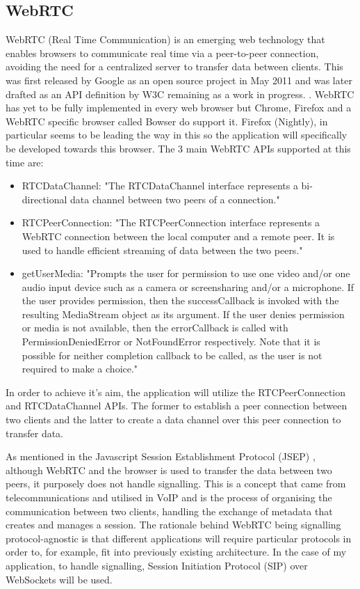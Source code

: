\documentclass[]{report}
\begin{document}
			\subsection*{WebRTC}			
			WebRTC (Real Time Communication) is an emerging web technology that enables browsers to communicate real time via a peer-to-peer connection, avoiding the need for a centralized server to transfer data between clients. This was first released by Google as an open source project in May 2011 \cite{Google WebRTC Release} and was later drafted as an API definition by W3C remaining as a work in progress. \cite{W3C WebRTC Definition}. WebRTC has yet to be fully implemented in every web browser but Chrome, Firefox and a WebRTC specific browser called Bowser do support it. Firefox (Nightly), in particular seems to be leading the way in this so the application will specifically be developed towards this browser\cite{WebRTC browser support}.
			The 3 main WebRTC APIs supported at this time are:
				\begin{itemize}
					\item RTCDataChannel:
					"The RTCDataChannel interface represents a bi-directional data channel between two peers of a connection." \cite{Mozilla Web API}
					\item RTCPeerConnection:
					"The RTCPeerConnection interface represents a WebRTC connection between the local computer and a remote peer. It is used to handle efficient streaming of data between the two peers." 
					\cite{Mozilla Web API}
					\item getUserMedia:
					"Prompts the user for permission to use one video and/or one audio input device such as a camera or screensharing and/or a microphone. If the user provides permission, then the successCallback is invoked with the resulting MediaStream object as its argument. If the user denies permission or media is not available, then the errorCallback is called with PermissionDeniedError or NotFoundError respectively. Note that it is possible for neither completion callback to be called, as the user is not required to make a choice."\cite{Mozilla Web API}
				\end{itemize}
			In order to achieve it's aim, the application will utilize the RTCPeerConnection and RTCDataChannel APIs. The former to establish a peer connection between two clients and the latter to create a data channel over this peer connection to transfer data.
					
			As mentioned in the Javascript Session Establishment Protocol (JSEP) \cite{JSEP}, although WebRTC and the browser is used to transfer the data between two peers, it purposely does not handle signalling. This is a concept that came from telecommunications and utilised in VoIP and is the process of organising the communication between two clients, handling the exchange of metadata that creates and manages a session. The rationale behind WebRTC being signalling protocol-agnostic is that different applications will require particular protocols in order to, for example, fit into previously existing architecture. In the case of my application, to handle signalling, Session Initiation Protocol (SIP) over WebSockets will be used.
			
\end{document}

